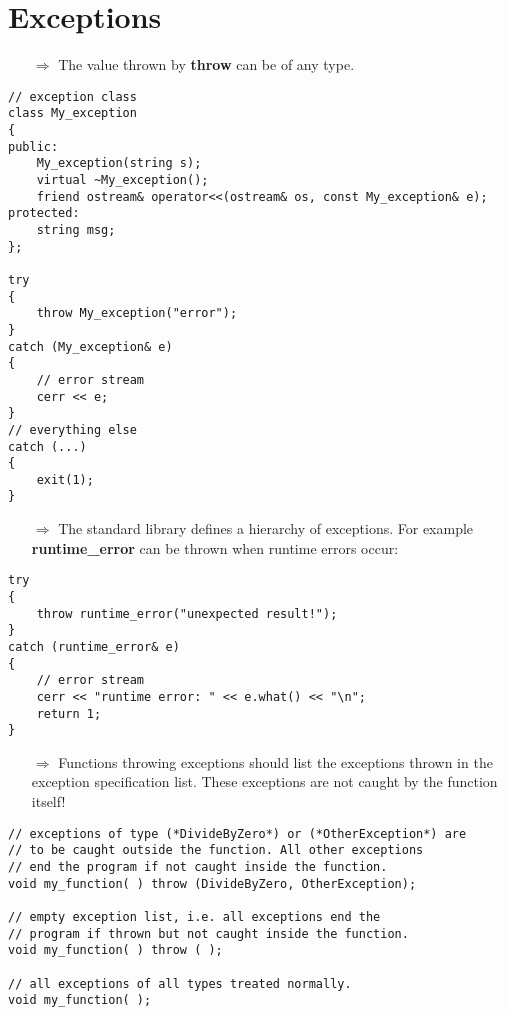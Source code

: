 \documentclass[10pt]{article}
\begin{document}
\section{Exceptions}
\small
\begin{enumerate}
\item[$\Rightarrow$] The value thrown by
\textbf{throw} can be of any type.
\end{enumerate}
\begin{lstlisting}
// exception class
class My_exception
{
public:
    My_exception(string s);
    virtual ~My_exception();
    friend ostream& operator<<(ostream& os, const My_exception& e);
protected:
    string msg;
};

try
{
    throw My_exception("error");
}
catch (My_exception& e)
{
    // error stream
    cerr << e;
}
// everything else
catch (...)
{
    exit(1);
}
\end{lstlisting}
\begin{enumerate}
\item[$\Rightarrow$] The standard library defines a hierarchy of exceptions.  For example \textbf{runtime\_error} can be 
thrown when runtime errors occur:
\end{enumerate}
\begin{lstlisting}
try
{
    throw runtime_error("unexpected result!");
}
catch (runtime_error& e)
{
    // error stream
    cerr << "runtime error: " << e.what() << "\n";
    return 1;
}
\end{lstlisting}
\begin{enumerate}
\item[$\Rightarrow$] Functions throwing exceptions should list the exceptions thrown in
the exception specification list. These exceptions are not 
caught by the function itself!
\end{enumerate}
\begin{lstlisting}
// exceptions of type (*DivideByZero*) or (*OtherException*) are
// to be caught outside the function. All other exceptions 
// end the program if not caught inside the function.
void my_function( ) throw (DivideByZero, OtherException);

// empty exception list, i.e. all exceptions end the
// program if thrown but not caught inside the function.
void my_function( ) throw ( );

// all exceptions of all types treated normally.
void my_function( );
\end{lstlisting}
%
%
\end{document}
